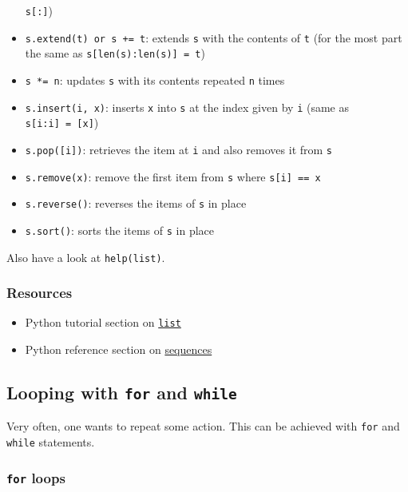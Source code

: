 \documentclass[12pt]{article} \newif\ifsolution\solutiontrue %
\begin{document}
\begin{itemize}
  \texttt{s{[}:{]}})
\item
  \texttt{s.extend(t)\ or\ s\ +=\ t}: extends \texttt{s} with the
  contents of \texttt{t} (for the most part the same as
  \texttt{s{[}len(s):len(s){]}\ =\ t})
\item
  \texttt{s\ *=\ n}: updates \texttt{s} with its contents repeated
  \texttt{n} times
\item
  \texttt{s.insert(i,\ x)}: inserts \texttt{x} into \texttt{s} at the
  index given by \texttt{i} (same as \texttt{s{[}i:i{]}\ =\ {[}x{]}})
\item
  \texttt{s.pop({[}i{]})}: retrieves the item at \texttt{i} and also
  removes it from \texttt{s}
\item
  \texttt{s.remove(x)}: remove the first item from \texttt{s} where
  \texttt{s{[}i{]}\ ==\ x}
\item
  \texttt{s.reverse()}: reverses the items of \texttt{s} in place
\item
  \texttt{s.sort()}: sorts the items of \texttt{s} in place
\end{itemize}

Also have a look at \texttt{help(list)}.

\subsubsection{Resources}\label{resources}

\begin{itemize}
\item
  Python tutorial section on
  \href{https://docs.python.org/3/tutorial/introduction.html\#lists}{\texttt{list}}
\item
  Python reference section on
  \href{https://docs.python.org/3/library/stdtypes.html\#sequence-types-list-tuple-range}{sequences}
\end{itemize}


\subsection{\texorpdfstring{Looping with \texttt{for} and
\texttt{while}}{Looping with for and while}}\label{looping-with-for-and-while}

Very often, one wants to repeat some action. This can be achieved with
\texttt{for} and \texttt{while} statements.

\subsubsection{\texorpdfstring{\texttt{for}
loops}{for loops}}\label{for-loops}
\end{document}
